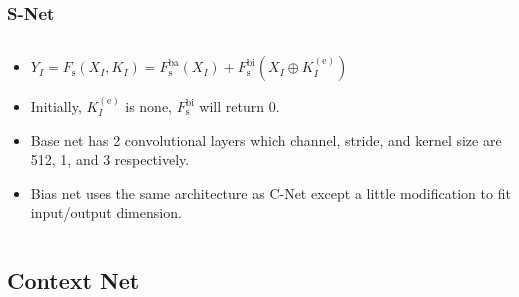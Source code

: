 \documentclass[12pt, aspectratio = 169, xcolor = x11names]{beamer}
\begin{document}
\begin{frame}
  \frametitle{S-Net}
  \begin{columns}
    \pause%
    \begin{column}{0.5\textwidth}
      \begin{itemize}[<+->]
        \item$Y_I = F_\mathrm{s}(X_I, K_I) = F_\mathrm{s}^\mathrm{ba}(X_I) +
          F_\mathrm{s}^\mathrm{bi}(X_I \oplus K_I^{(\mathrm{e})})$
        \item Initially, $K_I^{(\mathrm{e})}$ is none,
          $F_\mathrm{s}^\mathrm{bi}$ will return 0.
        \item Base net has 2 convolutional layers which channel, stride, and
          kernel size are 512, 1, and 3 respectively.
        \item Bias net uses the same architecture as C-Net except a little
          modification to fit input/output dimension.
      \end{itemize}
    \end{column}
  \end{columns}
\end{frame}

\subsection{Context Net}%
\label{sub:context_net}
\end{document}

